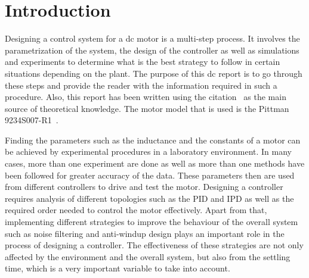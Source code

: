 \section{Introduction}

Designing a control system for a dc motor is a multi-step process. It involves the parametrization of the system, the design of the controller as well as simulations and experiments to determine what is the best strategy to follow in certain situations depending on the plant. The purpose of this dc report is to go through these steps and provide the reader with the information required in such a procedure. Also, this report has been written using the citation~\cite{feedback} as the main source of theoretical knowledge. The motor model that is used is the Pittman 9234S007-R1~\cite{pittmann}.

Finding the parameters such as the inductance and the constants of a motor can be achieved by experimental procedures in a laboratory environment. In many cases, more than one experiment are done as well as more than one methods have been followed for greater accuracy of the data. These parameters then are used from different controllers to drive and test the motor. Designing a controller requires analysis of different topologies such as the PID and IPD as well as the required order needed to control the motor effectively. Apart from that, implementing different strategies to improve the behaviour of the overall system such as noise filtering and anti-windup design plays an important role in the process of designing a controller. The effectiveness of these strategies are not only affected by the environment and the overall system, but also from the settling time, which is a very important variable to take into account.

